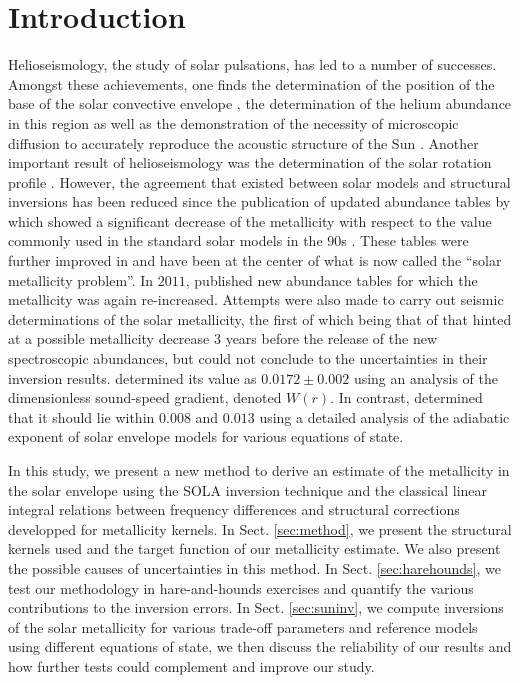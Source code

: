 \documentclass[a4paper,fleqn,usenatbib]{mnras}
\begin{document}
\section{Introduction} \label{sec:intro}
Helioseismology, the study of solar pulsations, has led to a number of successes. Amongst these achievements, one finds the determination of the position of the base of the solar convective envelope \citep[see][, and references therein.]{BasuConv}, the determination of the helium abundance in this region \citep{BasuY} as well as the demonstration of the necessity of microscopic diffusion to accurately reproduce the acoustic structure of the Sun \citep{BasuDiff}. Another important result of helioseismology was the determination of the solar rotation profile \citep{Brown, SchouRot,Schou}. However, the agreement that existed between solar models and structural inversions has been reduced since the publication of updated abundance tables by \citet{AspG} which showed a significant decrease of the metallicity with respect to the value commonly used in the standard solar models in the $90$s \citep[][ hereafter GN93 and GS98, respectively]{GN93, GreSauv}. These tables were further improved in \citet{AGSS} and have been at the center of what is now called the ``solar metallicity problem''. In $2011$, \citet{Caffau} published new abundance tables for which the metallicity was again re-increased. Attempts were also made to carry out seismic determinations of the solar metallicity, the first of which being that of  \citet{Takata} that hinted at a possible metallicity decrease $3$ years before the release of the new spectroscopic abundances, but could not conclude to the uncertainties in their inversion results. \citet{Basu} determined its value as $0.0172 \pm 0.002$ using an analysis of the dimensionless sound-speed gradient, denoted $W(r)$. In contrast, \citet{Vorontsov} determined that it should lie within $0.008$ and $0.013$ using a detailed analysis of the adiabatic exponent of solar envelope models for various equations of state.

In this study, we present a new method to derive an estimate of the metallicity in the solar envelope using the SOLA inversion technique \citep{Pijpers} and  the classical linear integral relations between frequency differences and structural corrections developped for metallicity kernels. In Sect. \ref{sec:method}, we present the structural kernels used and the target function of our metallicity estimate. We also present the possible causes of uncertainties in this method. In Sect. \ref{sec:harehounds}, we test our methodology in hare-and-hounds exercises and quantify the various contributions to the inversion errors. In Sect. \ref{sec:suninv}, we compute inversions of the solar metallicity for various trade-off parameters and reference models using different equations of state, we then discuss the reliability of our results and how further tests could complement and improve our study.
\end{document}
